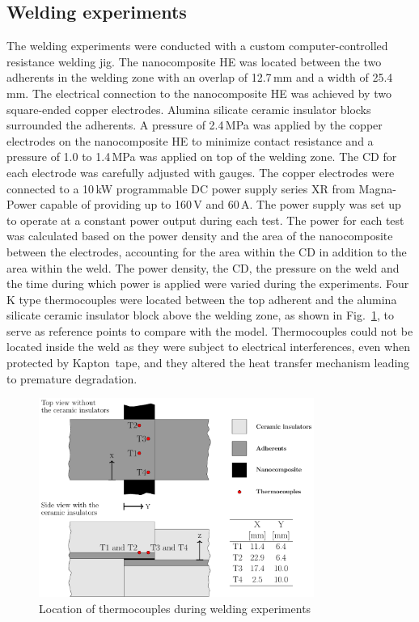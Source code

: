 \documentclass[review,times,sagev,doublespace]{sagej}
\begin{document}
\subsection{Welding experiments}

The welding experiments were conducted with a custom computer-controlled resistance welding jig. 
The nanocomposite HE was located between the two adherents in the welding zone with an overlap of \mbox{12.7\,mm} and a width of \mbox{25.4\,mm}. 
The electrical connection to the nanocomposite HE was achieved by two square-ended copper electrodes. 
Alumina silicate ceramic insulator blocks surrounded the adherents. 
A pressure of \mbox{2.4\,MPa} was applied by the copper electrodes on the nanocomposite HE to minimize contact resistance and a pressure of 1.0 to \mbox{1.4\,MPa} was applied on top of the welding zone. 
The {CD} for each electrode was carefully adjusted with gauges. 
The copper electrodes were connected to a \mbox{10\,kW} programmable DC power supply series XR from Magna-Power capable of providing up to \mbox{160\,V} and \mbox{60\,A}. 
The power supply was set up to operate at a constant power output during each test. 
The power for each test was calculated based on the power density and the area of the nanocomposite between the electrodes, accounting for the area within the {CD} in addition to the area within the weld. 
The power density, the {CD}, the pressure on the weld and the time during which power is applied were varied during the experiments. 
Four K type thermocouples were located between the top adherent and the alumina silicate ceramic insulator block above the welding zone, as shown in \mbox{Fig.~\ref{fig:Fig3}}, to serve as reference points to compare with the model. 
Thermocouples could not be located inside the weld as they were subject to electrical interferences, even when protected by Kapton\textregistered \ tape, and they altered the heat transfer mechanism leading to premature degradation.  

\begin{figure}[ht]
	\center
	\includegraphics[width=90mm]{Fig3}
	\caption{Location of thermocouples during welding experiments}
	\label{fig:Fig3}
\end{figure} 
\end{document}
